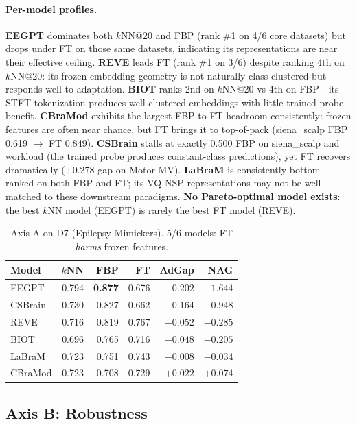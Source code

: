 \documentclass{article}
\begin{document}
\paragraph{Per-model profiles.}
\textbf{EEGPT} dominates both $k$NN@20 and FBP (rank \#1 on 4/6 core datasets) but drops under FT on those same datasets, indicating its representations are near their effective ceiling. \textbf{REVE} leads FT (rank \#1 on 3/6) despite ranking 4th on $k$NN@20: its frozen embedding geometry is not naturally class-clustered but responds well to adaptation. \textbf{BIOT} ranks 2nd on $k$NN@20 vs 4th on FBP---its STFT tokenization produces well-clustered embeddings with little trained-probe benefit. \textbf{CBraMod} exhibits the largest FBP-to-FT headroom consistently: frozen features are often near chance, but FT brings it to top-of-pack (siena\_scalp FBP 0.619 $\to$ FT 0.849). \textbf{CSBrain} stalls at exactly 0.500 FBP on siena\_scalp and workload (the trained probe produces constant-class predictions), yet FT recovers dramatically (+0.278 gap on Motor MV). \textbf{LaBraM} is consistently bottom-ranked on both FBP and FT; its VQ-NSP representations may not be well-matched to these downstream paradigms. \textbf{No Pareto-optimal model exists}: the best $k$NN model (EEGPT) is rarely the best FT model (REVE).

\begin{table}[t]
  \caption{Axis A on D7 (Epilepsy Mimickers). 5/6 models: FT \emph{harms} frozen features.}
  \label{tab:d7_axis_a}
  \centering
  \small
  \begin{tabular}{lrrrrr}
    \toprule
    Model & $k$NN & FBP & FT & AdGap & NAG \\
    \midrule
    EEGPT & 0.794 & \textbf{0.877} & 0.676 & $-0.202$ & $-1.644$ \\
    CSBrain & 0.730 & 0.827 & 0.662 & $-0.164$ & $-0.948$ \\
    REVE & 0.716 & 0.819 & 0.767 & $-0.052$ & $-0.285$ \\
    BIOT & 0.696 & 0.765 & 0.716 & $-0.048$ & $-0.205$ \\
    LaBraM & 0.723 & 0.751 & 0.743 & $-0.008$ & $-0.034$ \\
    CBraMod & 0.723 & 0.708 & 0.729 & $+0.022$ & $+0.074$ \\
    \bottomrule
  \end{tabular}
\end{table}

\subsection{Axis B: Robustness}
\label{sec:results_b}
\end{document}
